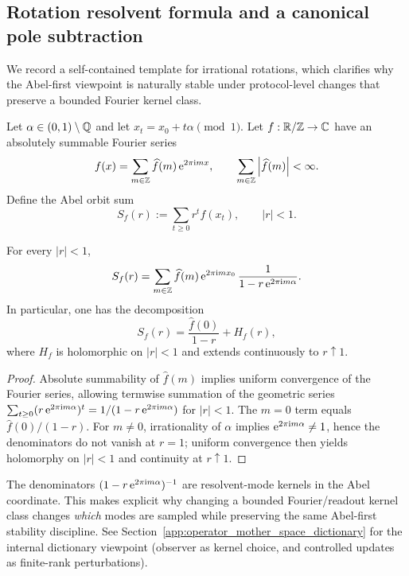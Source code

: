 \subsection{Rotation resolvent formula and a canonical pole subtraction}
\label{subsec:abel_resolvent_rotation}

We record a self-contained template for irrational rotations, which clarifies why the Abel-first viewpoint is naturally stable under protocol-level changes that preserve a bounded Fourier kernel class.

Let $\alpha\in(0,1)\setminus\mathbb{Q}$ and let $x_t=x_0+t\alpha\pmod 1$.
Let $f:\mathbb{R}/\mathbb{Z}\to\mathbb{C}$ have an absolutely summable Fourier series
\[
f(x)=\sum_{m\in\mathbb{Z}} \widehat f(m)\,\mathrm{e}^{2\pi\mathrm{i} m x},
\qquad
\sum_{m\in\mathbb{Z}}\left\lvert \widehat f(m)\right\rvert<\infty.
\]
Define the Abel orbit sum
\[
S_f(r):=\sum_{t\ge 0} r^t f(x_t),\qquad |r|<1.
\]

\begin{proposition}
\label{prop:abel_resolvent_universal_pole}
\MathTag For every $|r|<1$,
\[
S_f(r)=\sum_{m\in\mathbb{Z}}\widehat f(m)\,\mathrm{e}^{2\pi\mathrm{i} m x_0}\,\frac{1}{1-r\,\mathrm{e}^{2\pi\mathrm{i} m\alpha}}.
\]
In particular, one has the decomposition
\[
S_f(r)=\frac{\widehat f(0)}{1-r}+H_f(r),
\]
where $H_f$ is holomorphic on $|r|<1$ and extends continuously to $r\uparrow 1$.
\end{proposition}
\begin{proof}
Absolute summability of $\widehat f(m)$ implies uniform convergence of the Fourier series, allowing termwise summation of the geometric series
$
\sum_{t\ge 0}(r\,\mathrm{e}^{2\pi\mathrm{i} m\alpha})^t=1/(1-r\,\mathrm{e}^{2\pi\mathrm{i} m\alpha})
$
for $|r|<1$.
The $m=0$ term equals $\widehat f(0)/(1-r)$.
For $m\neq 0$, irrationality of $\alpha$ implies $\mathrm{e}^{2\pi\mathrm{i} m\alpha}\neq 1$, hence the denominators do not vanish at $r=1$; uniform convergence then yields holomorphy on $|r|<1$ and continuity at $r\uparrow 1$.
\end{proof}

\begin{remark}\label{rem:abel_resolvent_kernel_dictionary}
\InterfaceTag The denominators $(1-r\,\mathrm{e}^{2\pi\mathrm{i} m\alpha})^{-1}$ are resolvent-mode kernels in the Abel coordinate.
This makes explicit why changing a bounded Fourier/readout kernel class changes \emph{which} modes are sampled while preserving the same Abel-first stability discipline.
See Section~\ref{app:operator_mother_space_dictionary} for the internal dictionary viewpoint (observer as kernel choice, and controlled updates as finite-rank perturbations).
\end{remark}

